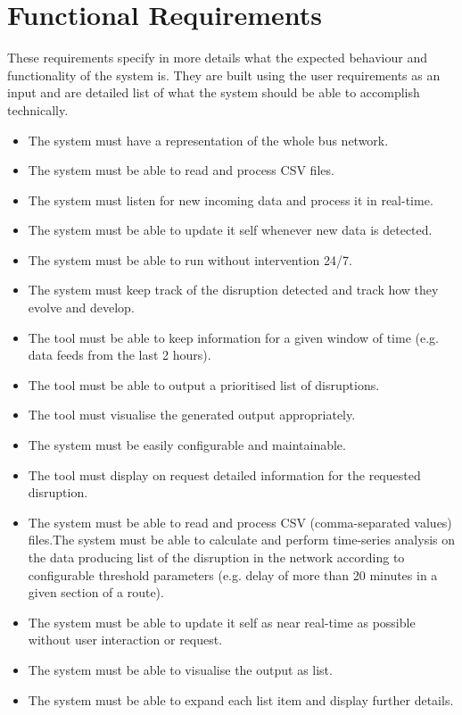 \section{Functional Requirements}
These requirements specify in more details what the expected behaviour and functionality of the system is. They are built using the user requirements as an input and are detailed list of what the system should be able to accomplish technically.
\begin{itemize}
	\item The system must have a representation of the whole bus network.
	\item The system must be able to read and process CSV files.
	\item The system must listen for new incoming data and process it in real-time.
	\item The system must be able to update it self whenever new data is detected.
	\item The system must be able to run without intervention 24/7.
	\item The system must keep track of the disruption detected and track how they evolve and develop.
	\item The tool must be able to keep information for a given window of time (e.g. data feeds from the last 2 hours).
	\item The tool must be able to output a prioritised list of disruptions.
	\item The tool must visualise the generated output appropriately.
	\item The system must be easily configurable and maintainable.
	\item The tool must display on request detailed information for the requested disruption.
\end{itemize}

\begin{itemize}
	\item The system must be able to read and process CSV (comma-separated
values) files.The system must be able to calculate and perform time-series analysis
on the data producing list of the disruption in the network according to
configurable threshold parameters (e.g. delay of more than 20 minutes
in a given section of a route).
	\item The system must be able to update it self as near real-time as possible
without user interaction or request.
	\item The system must be able to visualise the output as list.
	\item The system must be able to expand each list item and display further
details.
\end{itemize}

